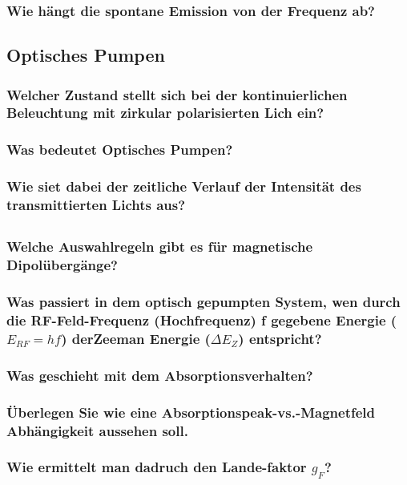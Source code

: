 \subsubsection[]{Wie hängt die spontane Emission von der Frequenz ab?}


\subsection{Optisches Pumpen}
\subsubsection[]{Welcher Zustand stellt sich bei der kontinuierlichen Beleuchtung mit zirkular polarisierten Lich ein?}
\subsubsection[]{Was bedeutet Optisches Pumpen?}
\subsubsection[]{Wie siet dabei der zeitliche Verlauf der Intensität des transmittierten Lichts aus?}

\subsection{}
\subsubsection[]{Welche Auswahlregeln gibt es für magnetische Dipolübergänge?}
\subsubsection[]{Was passiert in dem optisch gepumpten System, wen durch die RF-Feld-Frequenz (Hochfrequenz) f gegebene Energie ($E_{RF}=hf$) derZeeman Energie ($\Delta E_Z$) entspricht?}
\subsubsection[]{Was geschieht mit dem Absorptionsverhalten?}
\subsubsection[]{Überlegen Sie wie eine Absorptionspeak-vs.-Magnetfeld Abhängigkeit aussehen soll.}
\subsubsection[]{Wie ermittelt man dadruch den Lande-faktor $g_F$?}
